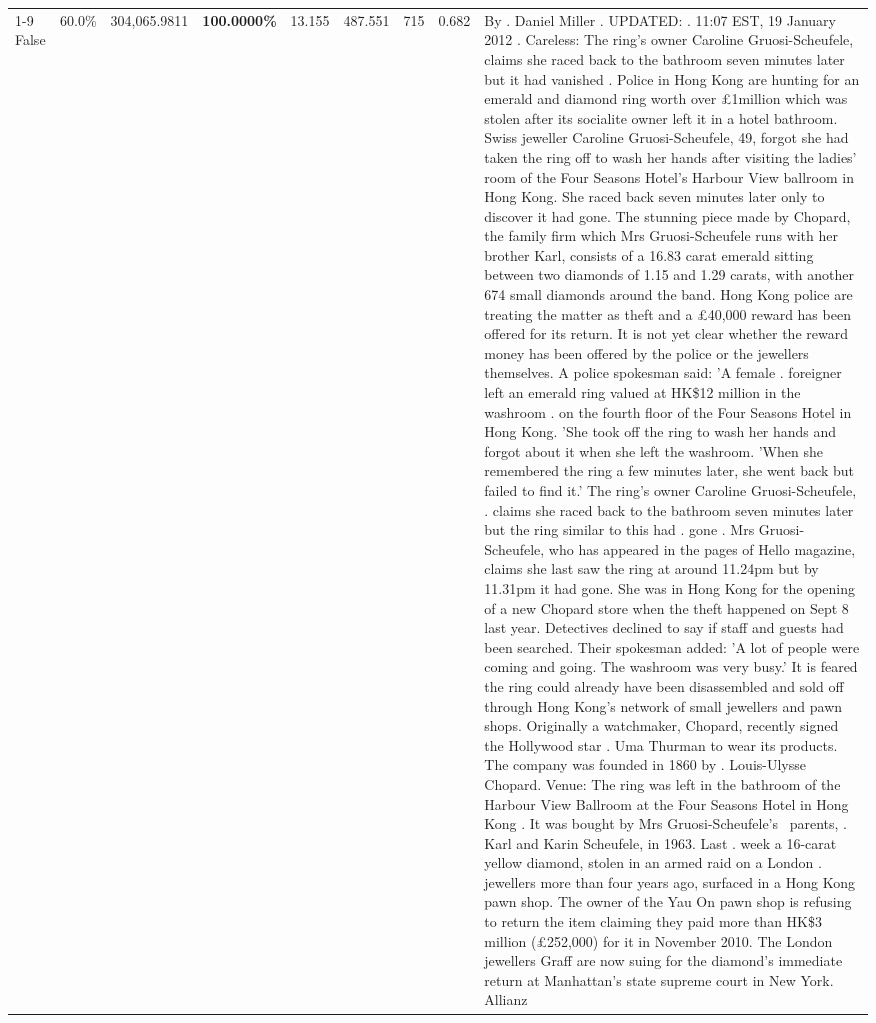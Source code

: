 \begin{table}[H]
\begin{tabular}{lllrlllll}
\cline{1-9}
False & 60.0\% & \color{red} 304,065.9811 & \bfseries \color{red} 100.0000\% & 13.155 & 487.551 & 715 & 0.682 & By . Daniel Miller . UPDATED: . 11:07 EST, 19 January 2012 . Careless: The ring's owner Caroline Gruosi-Scheufele, claims she raced back to the bathroom seven minutes later but it had vanished . Police in Hong Kong are hunting for an emerald and diamond ring worth over £1million which was stolen after its socialite owner left it in a hotel bathroom. Swiss jeweller Caroline Gruosi-Scheufele, 49, forgot she had taken the ring off to wash her hands after visiting the ladies' room of the Four Seasons Hotel's Harbour View ballroom in Hong Kong. She raced back seven minutes later only to discover it had gone. The stunning piece made by Chopard, the family firm which Mrs Gruosi-Scheufele runs with her brother Karl, consists of a 16.83 carat emerald sitting between two diamonds of 1.15 and 1.29 carats, with another 674 small diamonds around the band. Hong Kong police are treating the matter as theft and a £40,000 reward has been offered for its return. It is not yet clear whether the reward money has been offered by the police or the jewellers themselves. A police spokesman said: 'A female . foreigner left an emerald ring valued at HK\$12 million in the washroom . on the fourth floor of the Four Seasons Hotel in Hong Kong. 'She took off the ring to wash her hands and forgot about it when she left the washroom. 'When she remembered the ring a few minutes later, she went back but failed to find it.' The ring's owner Caroline Gruosi-Scheufele, . claims she raced back to the bathroom seven minutes later but the ring similar to this had . gone . Mrs Gruosi-Scheufele, who has appeared in the pages of Hello magazine, claims she last saw the ring at around 11.24pm but by 11.31pm it had gone. She was in Hong Kong for the opening of a new Chopard store when the theft happened on Sept 8 last year. Detectives declined to say if staff and guests had been searched. Their spokesman added: 'A lot of people were coming and going. The washroom was very busy.' It is feared the ring could already have been disassembled and sold off through Hong Kong's network of small jewellers and pawn shops. Originally a watchmaker, Chopard, recently signed the Hollywood star . Uma Thurman to wear its products. The company was founded in 1860 by . Louis-Ulysse Chopard. Venue: The ring was left in the bathroom of the Harbour View Ballroom at the Four Seasons Hotel in Hong Kong . It was bought by Mrs Gruosi-Scheufele's  parents, . Karl and Karin Scheufele, in 1963. Last . week a 16-carat yellow diamond, stolen in an armed raid on a London . jewellers more than four years ago, surfaced in a Hong Kong pawn shop. The owner of the Yau On pawn shop is refusing to return the item claiming they paid more than HK\$3 million (£252,000) for it in November 2010. The London jewellers Graff are now suing for the diamond’s immediate return at Manhattan’s state supreme court in New York. Allianz \\

\end{tabular}
\end{table}

